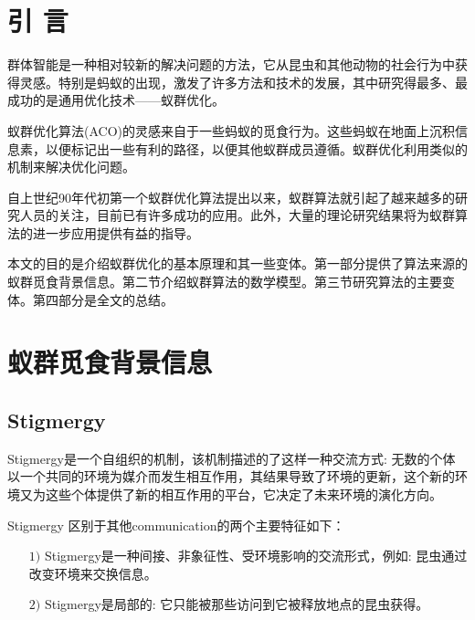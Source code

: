 \documentclass[10pt,a4paper,twocolumn,twoside,UTF8]{ctexart}
\begin{document}
\pagestyle{maincontent}%



\section{引 \quad 言}
	群体智能是一种相对较新的解决问题的方法，它从昆虫和其他动物的社会行为中获得灵感。特别是蚂蚁的出现，激发了许多方法和技术的发展，其中研究得最多、最成功的是通用优化技术——蚁群优化。\par
	蚁群优化算法(ACO)的灵感来自于一些蚂蚁的觅食行为。这些蚂蚁在地面上沉积信息素，以便标记出一些有利的路径，以便其他蚁群成员遵循。蚁群优化利用类似的机制来解决优化问题。 \par
	自上世纪90年代初第一个蚁群优化算法提出以来，蚁群算法就引起了越来越多的研究人员的关注，目前已有许多成功的应用。此外，大量的理论研究结果将为蚁群算法的进一步应用提供有益的指导。 \par
	本文的目的是介绍蚁群优化的基本原理和其一些变体。第一部分提供了算法来源的蚁群觅食背景信息。第二节介绍蚁群算法的数学模型。第三节研究算法的主要变体。第四部分是全文的总结。


\section{蚁群觅食背景信息}
	\subsection{Stigmergy}
Stigmergy是一个自组织的机制，该机制描述的了这样一种交流方式: 无数的个体以一个共同的环境为媒介而发生相互作用，其结果导致了环境的更新，这个新的环境又为这些个体提供了新的相互作用的平台，它决定了未来环境的演化方向。 \par
Stigmergy 区别于其他communication的两个主要特征如下：
	\begin{itemize}
		\item[$1)$] Stigmergy是一种间接、非象征性、受环境影响的交流形式，例如: 昆虫通过改变环境来交换信息。
		\item[$2)$] Stigmergy是局部的: 它只能被那些访问到它被释放地点的昆虫获得。
	\end{itemize}
\end{document}
